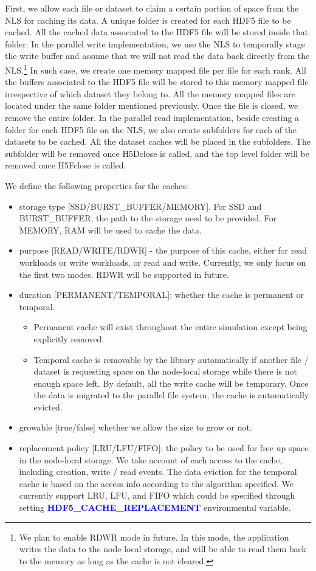 \documentclass[aps, prb, 11pt, notitlepage]{revtex4-1}
\def\keywords#1{\textcolor{blue}{{\bf #1}}}
\begin{document}
First, we allow each file or dataset to claim a certain portion of space from the NLS for caching its data. A unique folder is created for each HDF5 file to be cached. All the cached data associated to the HDF5 file will be stored inside that folder. In the parallel write implementation, we use the NLS to temporally stage the write buffer and assume that we will not read the data back directly from the NLS.\footnote{We plan to enable RDWR mode in future. In this mode, the application writes the data to the node-local storage, and will be able to read them back to the memory as long as the cache is not cleared.} In such case, we create one memory mapped file per file for each rank. All the buffers associated to the HDF5 file will be stored to this memory mapped file irrespective of which dataset they belong to. All the memory mapped files are located under the same folder mentioned previously. Once the file is closed, we remove the entire folder.  In the parallel read implementation, beside creating a folder for each HDF5 file on the NLS, we also create subfolders for each of the datasets to be cached. All the dataset caches will be placed in the subfolders. The subfolder will be removed once H5Dclose is called, and the top level folder will be removed once H5Fclose is called. 

We define the following properties for the caches: 
\begin{itemize}
\item storage type [SSD/BURST\_BUFFER/MEMORY]. For SSD and BURST\_BUFFER, the path to the storage need to be provided. For MEMORY, RAM will be used to cache the data. 
\item purpose [READ/WRITE/RDWR] - the purpose of this cache, either for read workloads or write workloads, or read and write. Currently, we only focus on the first two modes. RDWR will be supported in future. 
\item duration [PERMANENT/TEMPORAL]: whether the cache is permanent or temporal. 
\begin{itemize}
\item Permanent cache will exist throughout the entire simulation except being explicitly removed. 
\item Temporal cache is removable by the library automatically if another file / dataset is requesting space on the node-local storage while there is not enough space left. By default, all the write cache will be temporary. Once the data is migrated to the parallel file system, the cache is automatically evicted.
\end{itemize}
\item growable [true/false] whether we allow the size to grow or not. 
\item replacement policy [LRU/LFU/FIFO]: the policy to be used for free up space in the node-local storage. 
We take account of each access to the cache, including creation, write / read events. The data eviction for the temporal cache is based on the access info according to the algorithm specified. We currently support LRU, LFU, and FIFO which could be specified through setting \keywords{HDF5\_CACHE\_REPLACEMENT} environmental variable. 
\end{itemize}
\end{document}
